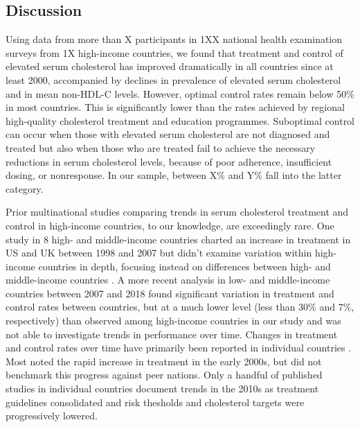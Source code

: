 \documentclass[12pt]{article}
\begin{document}
\begin{refsection}
\section{Discussion} \label{sec:discussion}
Using data from more than X participants in 1XX national health examination surveys from 1X high-income countries, we found that treatment and control of elevated serum cholesterol has improved dramatically in all countries since at least 2000, accompanied by declines in prevalence of elevated serum cholesterol and in mean non-HDL-C levels. However, optimal control rates remain below 50\% in most countries. This is significantly lower than the rates achieved by regional high-quality cholesterol treatment and education programmes\cite{koren_clinical_2004}. Suboptimal control can occur when those with elevated serum cholesterol are not diagnosed and treated but also when those who are treated fail to achieve the necessary reductions in serum cholesterol levels, because of poor adherence, insufficient dosing, or nonresponse. In our sample, between X\% and Y\% fall into the latter category. 

Prior multinational studies comparing trends in serum cholesterol treatment and control in high-income countries, to our knowledge, are exceedingly rare. One study in 8 high- and middle-income countries charted an increase in treatment in US and UK between 1998 and 2007 but didn't examine variation within high-income countries in depth, focusing instead on differences between high- and middle-income countries \cite{roth_high_2011}. A more recent analysis \cite{marcus_use_2022} in low- and middle-income countries between 2007 and 2018 found significant variation in treatment and control rates between countries, but at a much lower level (less than 30\% and 7\%, respectively) than observed among high-income countries in our study and was not able to investigate trends in performance over time. Changes in treatment and control rates over time have primarily been reported in individual countries \cite{muntner_trends_2013}. Most noted the rapid increase in treatment in the early 2000s, but did not benchmark this progress against peer nations. Only a handful of published studies in individual countries document trends in the 2010s as treatment guidelines consolidated and risk thesholds and cholesterol targets were progressively lowered.


\end{refsection}
\end{document}
